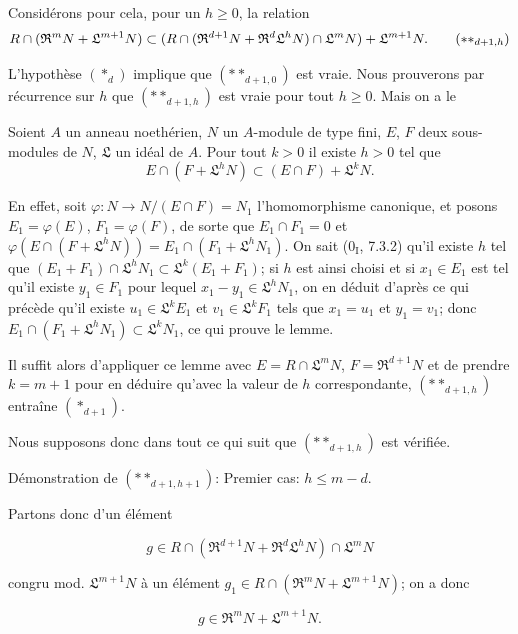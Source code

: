 Considérons pour cela, pour un $h\geq0$, la relation
\begin{equation}
  R\cap(\mathfrak R^mN+\mathfrak L^{m+1}N)\subset(R\cap(\mathfrak R^{d+1}N+\mathfrak R^d\mathfrak L^hN)\cap\mathfrak L^mN)+\mathfrak L^{m+1}N.
  \tag{$**_{d+1,h}$}
\end{equation}

L'hypothèse $(*_d)$ implique que $(**_{d+1,0})$ est vraie. Nous prouverons par récurrence sur $h$ que $(**_{d+1,h})$ est vraie pour tout $h\geq0$. Mais on a le

\begin{lemma}[19.7.1.7]
\label{IV.19.7.1.7}
Soient $A$ un anneau noethérien, $N$ un $A$-module de type fini, $E$, $F$ deux sous-modules de $N$, $\mathfrak L$ un idéal de $A$. Pour tout $k>0$ il existe $h>0$ tel que
\[
  E\cap(F+\mathfrak L^hN)\subset(E\cap F)+\mathfrak L^kN.
\]
\end{lemma}

En effet, soit $\varphi:N\to N/(E\cap F)=N_1$ l'homomorphisme canonique, et posons $E_1=\varphi(E)$, $F_1=\varphi(F)$, de sorte que $E_1\cap F_1=0$ et $\varphi(E\cap(F+\mathfrak L^hN))=E_1\cap(F_1+\mathfrak L^hN_1)$. On sait ($0_{\mathrm I}$, 7.3.2) qu'il existe $h$ tel que $(E_1+F_1)\cap\mathfrak L^hN_1\subset\mathfrak L^k(E_1+F_1)$; si $h$ est ainsi choisi et si $x_1\in E_1$ est tel qu'il existe $y_1\in F_1$ pour lequel $x_1-y_1\in\mathfrak L^hN_1$, on en déduit d'après ce qui précède qu'il existe $u_1\in\mathfrak L^kE_1$ et $v_1\in\mathfrak L^kF_1$ tels que $x_1=u_1$ et $y_1=v_1$; donc $E_1\cap(F_1+\mathfrak L^hN_1)\subset\mathfrak L^kN_1$, ce qui prouve le lemme.

Il suffit alors d'appliquer ce lemme avec $E=R\cap\mathfrak L^mN$, $F=\mathfrak R^{d+1}N$ et de prendre $k=m+1$ pour en déduire qu'avec la valeur de $h$ correspondante, $(**_{d+1,h})$ entraîne $(*_{d+1})$.

Nous supposons donc dans tout ce qui suit que $(**_{d+1,h})$ est vérifiée.

\begin{env}[19.7.1.8]
\label{IV.19.7.1.8}
Démonstration de $(**_{d+1,h+1})$: Premier cas: $h\leq m-d$.
\end{env}

Partons donc d'un élément
\begin{env}[19.7.1.9]
\label{IV.19.7.1.9}
\[
  g\in R\cap(\mathfrak R^{d+1}N+\mathfrak R^d\mathfrak L^hN)\cap\mathfrak L^mN
\]
\end{env}
congru mod. $\mathfrak L^{m+1}N$ à un élément $g_1\in R\cap(\mathfrak R^mN+\mathfrak L^{m+1}N)$; on a donc
\begin{env}[19.7.1.10]
\label{IV.19.7.1.10}
\[
  g\in\mathfrak R^mN+\mathfrak L^{m+1}N.
\]
\end{env}

